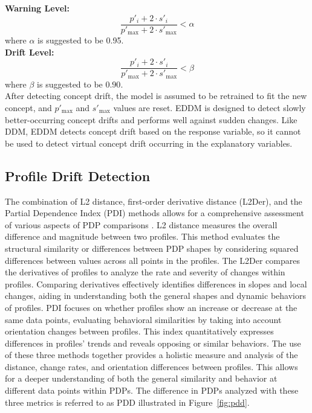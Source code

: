 \documentclass[pdflatex,sn-mathphys-ay]{sn-jnl}%
\theoremstyle{thmstyleone}%
\theoremstyle{thmstyletwo}%
\theoremstyle{thmstylethree}%
\begin{document}
\textbf{Warning Level:} 
\begin{equation}
  \frac{p'_i + 2 \cdot s'_i}{p'_{\text{max}} + 2 \cdot s'_{\text{max}}} < \alpha
\end{equation}
where \(\alpha\) is suggested to be 0.95.\\
  
\textbf{Drift Level:} 
\begin{equation}
  \frac{p'_i + 2 \cdot s'_i}{p'_{\text{max}} + 2 \cdot s'_{\text{max}}} < \beta
\end{equation}
where \(\beta\) is suggested to be $0.90$.\\

After detecting concept drift, the model is assumed to be retrained to fit the new concept, and \(p'_{\text{max}}\) and \(s'_{\text{max}}\) values are reset. EDDM is designed to detect slowly better-occurring concept drifts and performs well against sudden changes. Like DDM, EDDM detects concept drift based on the response variable, so it cannot be used to detect virtual concept drift occurring in the explanatory variables.

\subsection{Profile Drift Detection}

The combination of L2 distance, first-order derivative distance (L2Der), and the Partial Dependence Index (PDI) methods allows for a comprehensive assessment of various aspects of PDP comparisons \citep{kobylinska_2024}. L2 distance measures the overall difference and magnitude between two profiles. This method evaluates the structural similarity or differences between PDP shapes by considering squared differences between values across all points in the profiles. The L2Der compares the derivatives of profiles to analyze the rate and severity of changes within profiles. Comparing derivatives effectively identifies differences in slopes and local changes, aiding in understanding both the general shapes and dynamic behaviors of profiles. PDI focuses on whether profiles show an increase or decrease at the same data points, evaluating behavioral similarities by taking into account orientation changes between profiles. This index quantitatively expresses differences in profiles’ trends and reveals opposing or similar behaviors. The use of these three methods together provides a holistic measure and analysis of the distance, change rates, and orientation differences between profiles. This allows for a deeper understanding of both the general similarity and behavior at different data points within PDPs. The difference in PDPs analyzed with these three metrics is referred to as PDD illustrated in Figure~\ref{fig:pdd}.
\end{document}
